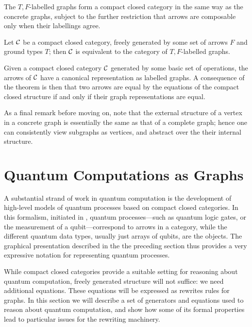 \documentclass[runningheads]{llncs}
\newcommand{\catC}{\ensuremath{{\cal C}}\xspace}
\begin{document}
The $T,F$-labelled graphs form a compact closed category in the same
way as the concrete graphs, subject to the further restriction
that arrows are composable only when their labellings agree.  

\begin{theorem}
  Let \catC be a compact closed category, freely generated by some set
  of arrows $F$ and ground types $T$;  then \catC is equivalent to the
  category  of $T,F$-labelled graphs.
\end{theorem}

Given a compact closed  category  \catC generated by some basic set of
operations,  the arrows of \catC have a canonical representation as
labelled graphs.  A consequence of the theorem is then that two arrows
are equal by the equations of the compact closed  structure if and
only if their graph representations are equal.

As a final remark before moving on, note that the external structure
of a vertex in a concrete graph is essentially the same as that of a
complete graph; hence one can consistently view subgraphs as vertices,
and abstract over the their internal structure.

\section{Quantum Computations as Graphs}
\label{sec:quotients-rewriting}

A substantial strand of work in quantum computation is
the development of high-level models of quantum processes based on
compact closed  categories.  In this formalism, initiated in
\cite{AbrCoe:CatSemQuant:2004}, quantum processes---such as quantum
logic gates, or the measurement of a qubit---correspond to arrows
in a category, while the different quantum data types, usually just
arrays of qubits, are the objects.  The graphical presentation
described in the the preceding section thus provides a very expressive
notation for representing quantum processes.

While compact closed categories provide a suitable setting for
reasoning about quantum computation,
freely generated structure will not suffice:  we need additional
equations.  These equations will be expressed as rewrites rules for
graphs.  In this section we will describe a set of generators and equations
used to reason about quantum computation, and show how some of its formal
properties lead to particular issues for the rewriting machinery.
\end{document}
